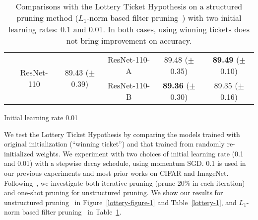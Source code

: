 \begin{table}[!htbp]
\begin{subtable}[b]{\textwidth}
\begin{tabular}{c|ccccc}
                          & \multirow{2}{*}{ResNet-110} & \multirow{2}{*}{89.43 ($\pm$0.39)} & ResNet-110-A & 89.48 ($\pm$0.35)  & \textbf{89.49} ($\pm$0.10) \\
                          &                             &                              & ResNet-110-B & \textbf{89.36} ($\pm$0.30)  & 89.35 ($\pm$0.16) \\ \hline
\end{tabular}
\caption{Initial learning rate 0.01}
\end{subtable}
\caption{Comparisons with the Lottery Ticket Hypothesis on a structured pruning method ($L_1$-norm based filter pruning~\cite{li2016pruning}) with two initial learning rates: 0.1 and 0.01. In both cases, using winning tickets does not bring improvement on accuracy.}
\label{lottery-2}
\end{table}

We test the Lottery Ticket Hypothesis by comparing the models trained with original initialization (``winning ticket'') and that trained from randomly re-initialized weights. We experiment with two choices of initial learning rate (0.1 and 0.01) with a stepwise decay schedule, using momentum SGD. 0.1 is used in our previous experiments and most prior works on CIFAR and ImageNet. Following~\cite{lottery}, we investigate both iterative pruning (prune 20\% in each iteration) and one-shot pruning for unstructured pruning. We show our results for unstructured  pruning~\cite{han2015learning} in Figure~\ref{lottery-figure-1} and Table~\ref{lottery-1}, and $L_1$-norm based filter pruning~\cite{li2016pruning} in Table~\ref{lottery-2}.



